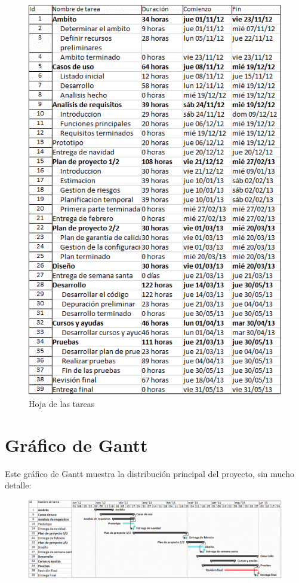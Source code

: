 \documentclass[spanish,a4paper,11pt, twoside]{report}	%
\begin{document}
	\begin{figure}[!h]
	\centering
	\includegraphics[scale=0.95]{HojaTareas.png}
	\caption{Hoja de las tareas}
	\end{figure}

	\newpage

	\section{Gráfico de  Gantt}

	Este gráfico de Gantt  muestra la distribución principal del proyecto, sin mucho detalle:

	\begin{figure}[!h]
	\centering
	\includegraphics[scale=0.57]{GraficoGantt.png}
	\end{figure}
\end{document}
